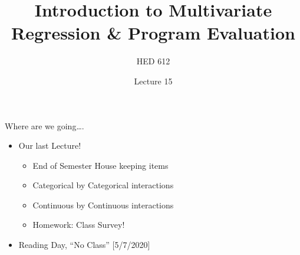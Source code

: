 \documentclass[8pt,ignorenonframetext,dvipsnames]{beamer}
\title{Introduction to Multivariate Regression \& Program Evaluation}
\subtitle{HED 612}
\author{Lecture 15}
\date{}
\providecommand{\tightlist}{%
  \setlength{\itemsep}{0pt}\setlength{\parskip}{0pt}}
\let\olditem\item
\renewcommand{\item}{%
  \olditem\vspace{4pt}
}
\begin{document}
\frame{\titlepage}

\begin{frame}
\tableofcontents[hideallsubsections]
\end{frame}
\begin{frame}{Where are we going\ldots{}.}
\protect\hypertarget{where-are-we-going.}{}

\begin{itemize}
\tightlist
\item
  Our last Lecture!

  \begin{itemize}
  \tightlist
  \item
    End of Semester House keeping items
  \item
    Categorical by Categorical interactions
  \item
    Continuous by Continuous interactions
  \item
    Homework: Class Survey!
  \end{itemize}
\end{itemize}

\medskip

\begin{itemize}
\tightlist
\item
  Reading Day, ``No Class'' {[}5/7/2020{]}
\end{itemize}

\end{frame}
\end{document}

